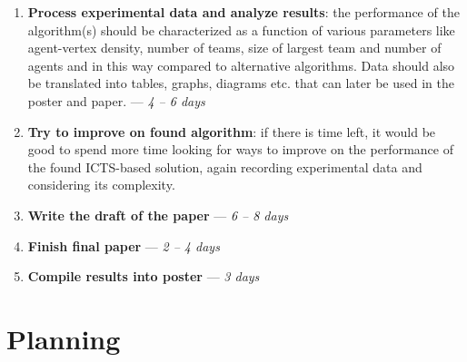 \documentclass[a4paper,10pt,english]{article}
\begin{document}
\begin{enumerate}
\begin{enumerate}
			\item Analyse time complexity, determine if the algorithm is an improvement over naïve approach
			\item Show optimality or give a counterexample
			\item Benchmark and compare to other algorithms using website\footnote{\url{https://dev.mapf.nl/}} that was set up for this purpose. Perhaps also run local benchmarks using experimental setup similar to that described in \cite{stern2019}. Record results for later use in paper. --- \textit{1 -- 2 days}
			\item Optional: Consider completeness of algorithm
		\end{enumerate} 
		If I came up with multiple algorithms before, I aim to also select one to proceed with at this point unless there is a good argument for choosing two (e.g. neither being strictly better than the other)
		\item \textbf{Process experimental data and analyze results}: the performance of the algorithm(s) should be characterized as a function of various parameters like agent-vertex density, number of teams, size of largest team and number of agents and in this way compared to alternative algorithms. Data should also be translated into tables, graphs, diagrams etc. that can later be used in the poster and paper. --- \textit{4 -- 6 days} 
		\item \textbf{Try to improve on found algorithm}: if there is time left, it would be good to spend more time looking for ways to improve on the performance of the found ICTS-based solution, again recording experimental data and considering its complexity.
		\item \textbf{Write the draft of the paper} --- \textit{6 -- 8 days}
		\item \textbf{Finish final paper} --- \textit{2 -- 4 days}
		\item \textbf{Compile results into poster} --- \textit{3 days}
		
	\end{enumerate}
	\section*{Planning} 
\end{document}

